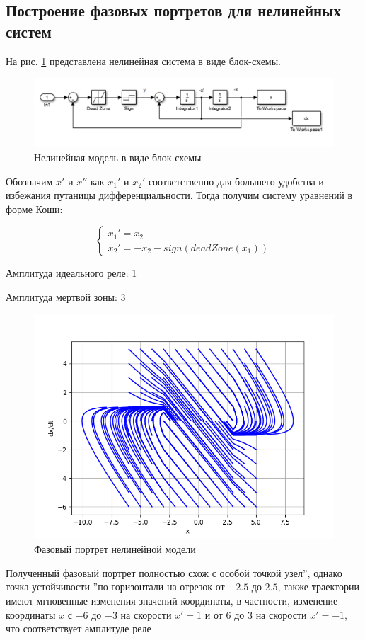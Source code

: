 \subsection{Построение фазовых портретов для нелинейных систем}

На рис. \ref{fig:13} представлена нелинейная система в виде блок-схемы.

\begin{figure}[H]
	\centering
	\includegraphics[width=1\linewidth]{body/images/simulink_scheme.png}
	\caption{Нелинейная модель в виде блок-схемы}
	\label{fig:13}
\end{figure}

Обозначим $x'$ и $x''$ как $x_1'$ и $x_2'$ соответственно для большего удобства и избежания путаницы дифференциальности. 
Тогда получим систему уравнений в форме Коши:

$$
\begin{cases}
	x_1' = x_2\\
	x_2' = - x_2 - sign(deadZone(x_1))
\end{cases}
$$

Амплитуда идеального реле: 1

Амплитуда мертвой зоны: 3

\begin{figure}[H]
	\centering
	\includegraphics[width=0.7\linewidth]{body/images/Simulink-system.png}
	\caption{Фазовый портрет нелинейной модели}
	\label{fig:14}
\end{figure}

Полученный фазовый портрет полностью схож с особой точкой  узел\textquotedblright, однако точка устойчивости
\textquotedblright по горизонтали на отрезок от $-2.5$ до $2.5$, 
также траектории имеют мгновенные изменения значений координаты, в частности, изменение координаты
$x$ с $-6$ до $-3$ на скорости $x'=1$ и от $6$ до $3$ на скорости $x'=-1$, что соответствует амплитуде реле

